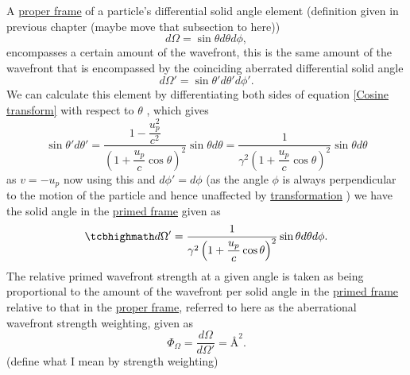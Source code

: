 A \hyperlink{def-proper-frame}{proper frame} of a particle's differential solid angle element  (definition given in previous chapter (maybe move that subsection to here))
\begin{equation}%
	d\Omega = \sin{\theta} d\theta d\phi,
\end{equation}%
encompasses a certain amount of the wavefront, this is the same amount of the wavefront that is encompassed by the coinciding aberrated differential solid angle
\begin{equation}%
	d\Omega' = \sin{\theta'} d\theta' d\phi'.
\end{equation}%
We can calculate this element by differentiating both sides of equation \eqref{Cosine transform} with respect to $\theta$ \cite{hogg1997special}, which gives
\begin{equation}%
	\sin{\theta'} d\theta' =   \dfrac{1-\dfrac{u_p^2}{c^2}}{\left(1+\dfrac{u_p}{c}\cos{\theta}\right)^2} \sin{\theta} d\theta =  \dfrac{1}{\gamma^2\left(1+\dfrac{u_p}{c}\cos{\theta}\right)^2} \sin{\theta} d\theta
\end{equation}%
as $v=-u_p$ now using this and $d\phi'=d\phi$ (as the angle $\phi$ is always perpendicular to the motion of the particle and hence unaffected by \hyperlink{def-transform}{transformation} ) we have the solid angle in the \hyperlink{def-Primed-Frame}{primed frame} given as
\begin{equation}%
	\mhl{
		d\Omega' = \dfrac{1}{\gamma^2\left(1+\dfrac{u_p}{c}\cos{\theta}\right)^2} \sin{\theta} d\theta d\phi.
	}
\end{equation}%
The relative primed wavefront strength at a given angle is taken as being proportional to the amount of the wavefront per solid angle in the \hyperlink{def-Primed-Frame}{primed frame} relative to that in the \hyperlink{def-proper-frame}{proper frame}, referred to here as the aberrational wavefront strength weighting, given as
\begin{equation}%
	\label{eq: aberrational wavefront weighting}
	\Phi_\Omega = \frac{d\Omega}{d\Omega'} = \text{\AA}^2.
\end{equation}%
(define what I mean by strength weighting)

